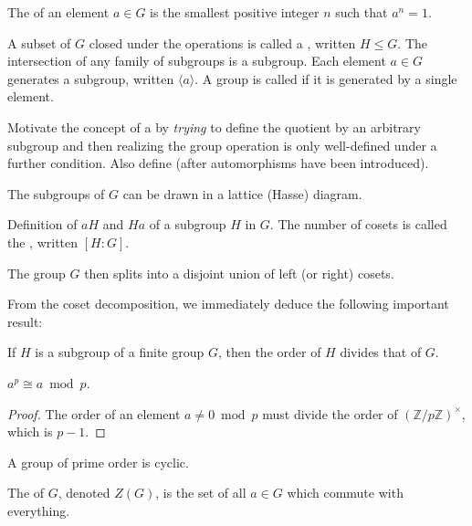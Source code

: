 The  of an element $a \in G$ is the smallest positive integer $n$ such that $a^n = 1$.

A subset of $G$ closed under the operations is called a , written $H \leq G$. The intersection of any family of subgroups is a subgroup. Each element $a \in G$ generates a subgroup, written $\langle a \rangle$. A group is called  if it is generated by a single element.

\begin{remark}
Motivate the concept of a  by \emph{trying} to define the quotient by an arbitrary subgroup and then realizing the group operation is only well-defined under a further condition. Also define  (after automorphisms have been introduced).
\end{remark}

The subgroups of $G$ can be drawn in a lattice (Hasse) diagram.

\begin{definition}
Definition of  $aH$ and $Ha$ of a subgroup $H$ in $G$. The number of cosets is called the , written $[H:G]$. %
\end{definition}

The group $G$ then splits into a disjoint union of left (or right) cosets.

From the coset decomposition, we immediately deduce the following important result:

\begin{theorem}[Lagrange]
If $H$ is a subgroup of a finite group $G$, then the order of $H$ divides that of $G$.
\end{theorem}

\begin{corollary}
$a^p \cong a \bmod p$.
\end{corollary}

\begin{proof}
The order of an element $a \neq 0 \bmod p$ must divide the order of $(\mathbb{Z}/p\mathbb{Z})^\times$, which is $p-1$.
\end{proof}

\begin{corollary}
A group of prime order is cyclic.
\end{corollary}

\begin{definition}
The  of $G$, denoted $Z(G)$, is the set of all $a \in G$ which commute with everything.
\end{definition}

